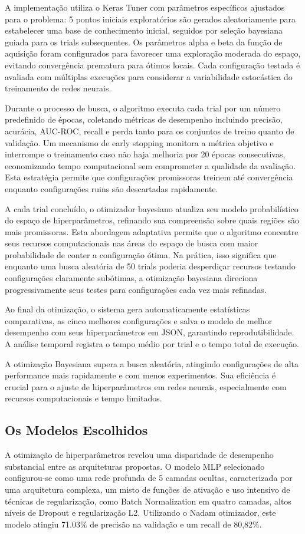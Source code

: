 A implementação utiliza o Keras Tuner com parâmetros específicos ajustados para o problema: 5 pontos iniciais exploratórios são gerados aleatoriamente para estabelecer uma base de conhecimento inicial, seguidos por seleção bayesiana guiada para os trials subsequentes. Os parâmetros alpha e beta da função de aquisição foram configurados para favorecer uma exploração moderada do espaço, evitando convergência prematura para ótimos locais. Cada configuração testada é avaliada com múltiplas execuções para considerar a variabilidade estocástica do treinamento de redes neurais.

Durante o processo de busca, o algoritmo executa cada trial por um número predefinido de épocas, coletando métricas de desempenho incluindo precisão, acurácia, AUC-ROC, recall e perda tanto para os conjuntos de treino quanto de validação. Um mecanismo de early stopping monitora a métrica objetivo e interrompe o treinamento caso não haja melhoria por 20 épocas consecutivas, economizando tempo computacional sem comprometer a qualidade da avaliação. Esta estratégia permite que configurações promissoras treinem até convergência enquanto configurações ruins são descartadas rapidamente.

A cada trial concluído, o otimizador bayesiano atualiza seu modelo probabilístico do espaço de hiperparâmetros, refinando sua compreensão sobre quais regiões são mais promissoras. Esta abordagem adaptativa permite que o algoritmo concentre seus recursos computacionais nas áreas do espaço de busca com maior probabilidade de conter a configuração ótima. Na prática, isso significa que enquanto uma busca aleatória de 50 trials poderia desperdiçar recursos testando configurações claramente subótimas, a otimização bayesiana direciona progressivamente seus testes para configurações cada vez mais refinadas.

Ao final da otimização, o sistema gera automaticamente estatísticas comparativas, as cinco melhores configurações e salva o modelo de melhor desempenho com seus hiperparâmetros em JSON, garantindo reprodutibilidade. A análise temporal registra o tempo médio por trial e o tempo total de execução.

A otimização Bayesiana supera a busca aleatória, atingindo configurações de alta performance mais rapidamente e com menos experimentos. Sua eficiência é crucial para o ajuste de hiperparâmetros em redes neurais, especialmente com recursos computacionais e tempo limitados.

\subsection{Os Modelos Escolhidos}
A otimização de hiperparâmetros revelou uma disparidade de desempenho substancial entre as arquiteturas propostas. O modelo MLP selecionado configurou-se como uma rede profunda de 5 camadas ocultas, caracterizada por uma arquitetura complexa, um misto de funções de ativação e uso intensivo de técnicas de regularização, como Batch Normalization em quatro camadas, altos níveis de Dropout e regularização L2. Utilizando o Nadam otimizador, este modelo atingiu 71.03\% de precisão na validação e um recall de 80,82\%.

